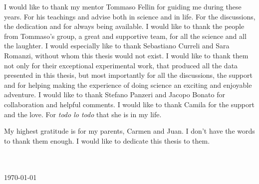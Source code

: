 \begin{acknowledgements}
\setcounter{page}{2}
\addchaptertocentry{\acknowledgementname} %
\vspace{1cm}


\noindent I would like to thank my mentor Tommaso Fellin for guiding me during these years. 
For his teachings and advise both in science and in life. 
For the discussions, the dedication and for always being available.     
I would like to thank the people from Tommaso's group, a great and supportive team, for all the science and all the laughter.  
I would especially like to thank Sebastiano Curreli and Sara Romanzi, without whom this thesis would not exist. 
I would like to thank them not only for their exceptional experimental work, that produced all the data presented in this thesis, but most importantly for all the discussions, the support and for helping making the experience of doing science an exciting and enjoyable adventure. 
I would like to thank Stefano Panzeri and Jacopo Bonato for collaboration and helpful comments.
I would like to thank Camila for the support and the love. For \textit{todo lo todo} that she is in my life.

My highest gratitude is for my parents, Carmen and Juan. I don't have the words to thank them enough. I would like to dedicate this thesis to them.  
\\[0.4cm]

\begin{flushright}
    \authorname \\
    \univname \\
    \usdate\today
\end{flushright}

\end{acknowledgements}